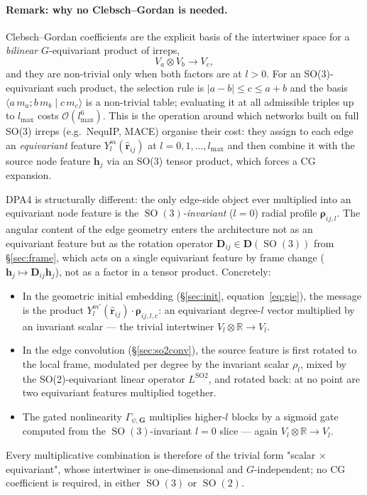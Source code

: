 \documentclass[11pt,a4paper]{article}
\DeclareMathOperator{\SO}{SO}
\newcommand{\R}{\mathbb{R}}
\newcommand{\bG}{\bm{G}}
\newcommand{\brh}{\hat{\bm{r}}}
\newcommand{\bh}{\bm{h}}
\newcommand{\bD}{\bm{D}}
\newcommand{\brho}{\bm{\rho}}
\newcommand{\lmax}{l_{\max}}
\theoremstyle{plain}
\theoremstyle{definition}
\theoremstyle{remark}
\begin{document}
\paragraph{Remark: why no Clebsch--Gordan is needed.}
Clebsch--Gordan coefficients are the explicit basis of the intertwiner space
for a \emph{bilinear} $G$-equivariant product of irreps,
\[
    V_{a}\otimes V_{b}\longrightarrow V_{c},
\]
and they are non-trivial only when both factors are at $l>0$. For an
SO(3)-equivariant such product, the selection rule is $|a-b|\le c\le a+b$ and
the basis $\langle a\,m_a;b\,m_b\mid c\,m_c\rangle$ is a non-trivial table;
evaluating it at all admissible triples up to $\lmax$ costs
$\mathcal{O}(\lmax^6)$. This is the operation around which networks built on
full SO(3) irreps (e.g.\ NequIP, MACE) organise their cost: they assign to each
edge an \emph{equivariant} feature $Y_l^{m}(\brh_{ij})$ at $l=0,1,\dots,\lmax$
and then combine it with the source node feature $\bh_j$ via an SO(3) tensor
product, which forces a CG expansion.

DPA4 is structurally different: the only edge-side object ever multiplied into
an equivariant node feature is the \emph{$\SO(3)$-invariant} ($l=0$) radial
profile $\brho_{ij,l}$. The angular content of the edge geometry enters the
architecture not as an equivariant feature but as the rotation operator
$\bD_{ij}\in\bD(\SO(3))$ from \S\ref{sec:frame}, which acts on a single
equivariant feature by frame change ($\bh_j\mapsto\bD_{ij}\bh_j$), not as a
factor in a tensor product. Concretely:
\begin{itemize}[leftmargin=2em]
    \item In the geometric initial embedding (\S\ref{sec:init}, equation~\eqref{eq:gie}),
          the message is the product $Y_l^{m'}(\brh_{ij})\cdot\brho_{ij,l,c}$: an
          equivariant degree-$l$ vector multiplied by an invariant scalar — the trivial
          intertwiner $V_l\otimes\R\to V_l$.
    \item In the edge convolution (\S\ref{sec:so2conv}), the source feature is first
          rotated to the local frame, modulated per degree by the invariant scalar
          $\rho_l$, mixed by the SO(2)-equivariant linear operator $L^{\mathrm{SO2}}$,
          and rotated back: at no point are two equivariant features multiplied together.
    \item The gated nonlinearity $\Gamma_{\psi,\bG}$ multiplies higher-$l$ blocks by a
          sigmoid gate computed from the $\SO(3)$-invariant $l=0$ slice — again
          $V_l\otimes\R\to V_l$.
\end{itemize}
Every multiplicative combination is therefore of the trivial form "scalar $\times$ equivariant", whose intertwiner is one-dimensional and $G$-independent; no CG coefficient is required, in either $\SO(3)$ or $\SO(2)$.
\end{document}
